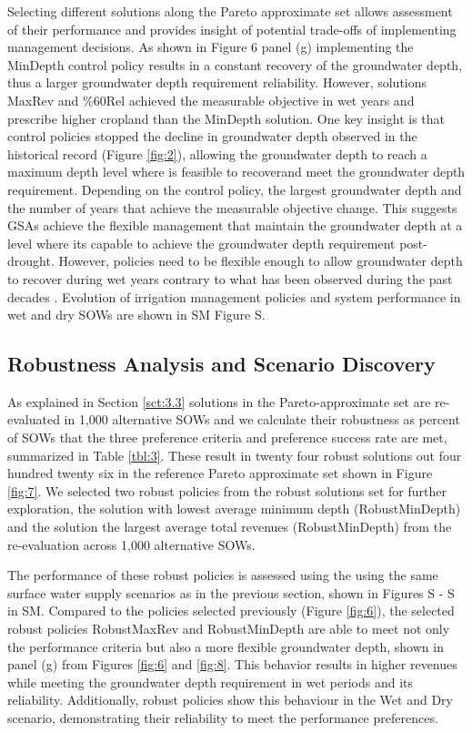 \documentclass[a4paper,fleqn]{cas-sc}
\begin{document}
Selecting different solutions along the Pareto approximate set allows assessment of their performance and provides insight of potential trade-offs of implementing management decisions. As shown in Figure 6 panel (g) implementing the MinDepth control policy results in a constant recovery of the groundwater depth, thus a larger groundwater depth requirement reliability. However, solutions MaxRev and \%60Rel achieved the measurable objective in wet years and prescribe higher cropland than the MinDepth solution. One key insight is that control policies stopped the decline in groundwater depth observed in the historical record (Figure \ref{fig:2}), allowing the groundwater depth to reach a maximum depth level where is feasible to recoverand meet the groundwater depth requirement. Depending on the control policy, the largest groundwater depth and the number of years that achieve the measurable objective change. This suggests GSAs achieve the flexible management that maintain the groundwater depth at a level where its capable to achieve the groundwater depth requirement post-drought. However, policies need to be flexible enough to allow groundwater depth to recover during wet years contrary to what has been observed during the past decades \citep{liu_groundwater_2022,alam_post-drought_2021}. Evolution of irrigation management policies and system performance in wet and dry SOWs are shown in SM Figure S.

\subsection{Robustness Analysis and Scenario Discovery}

As explained in Section \ref{sct:3.3} solutions in the Pareto-approximate set are re-evaluated in 1,000 alternative SOWs and we calculate their robustness as percent of SOWs that the three preference criteria and preference success rate are met, summarized in Table \ref{tbl:3}. These result in twenty four robust solutions out four hundred twenty six in the reference Pareto approximate set shown in Figure \ref{fig:7}. We selected two robust policies from the robust solutions set for further exploration, the solution with lowest average minimum depth (RobustMinDepth) and the solution the largest average total revenues (RobustMinDepth) from the re-evaluation across 1,000 alternative SOWs. 

The performance of these robust policies is assessed using the using the same surface water supply scenarios as in the previous section, shown in Figures S - S in SM. Compared to the policies selected previously (Figure \ref{fig:6}), the selected robust policies RobustMaxRev and RobustMinDepth are able to meet not only the performance criteria but also a more flexible groundwater depth, shown in panel (g) from Figures \ref{fig:6} and \ref{fig:8}. This behavior results in higher revenues while meeting the groundwater depth requirement in wet periods and its reliability. Additionally, robust policies show this behaviour in the Wet and Dry scenario, demonstrating their reliability to meet the performance preferences.
\end{document}
